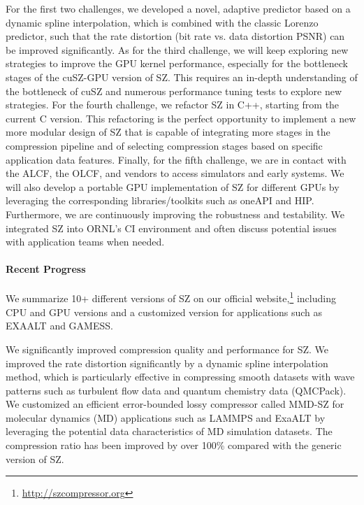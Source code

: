 For the first two challenges, we developed a novel, adaptive predictor based on a dynamic spline interpolation, which is combined with the classic Lorenzo predictor, such that the rate distortion (bit rate vs. data distortion PSNR) can be improved significantly.
%
As for the third challenge, we will keep exploring new strategies to improve the GPU kernel performance, especially for the bottleneck stages of the cuSZ-GPU version of SZ. This requires an in-depth understanding of the bottleneck of cuSZ and numerous performance tuning tests to explore new strategies.   
%
For the fourth challenge, we refactor SZ in C++, starting from the current C version. This refactoring is the perfect opportunity to implement a new more modular design of SZ that is capable of integrating more stages in the compression pipeline and of selecting compression stages based on specific application data features.
%
Finally, for the fifth challenge, we are in contact with the ALCF, the OLCF, and vendors to access simulators and early systems. We will also develop a portable GPU implementation of SZ for different GPUs by leveraging the corresponding libraries/toolkits such as oneAPI and HIP.
%
Furthermore, we are continuously improving the robustness and testability. We integrated SZ into ORNL's CI environment and often discuss potential issues with application teams when needed. 

\paragraph{Recent Progress}

We summarize 10+ different versions of SZ on our official website,\footnote{\url{http://szcompressor.org}} including CPU and GPU versions and a customized version for applications such as EXAALT and GAMESS. 

We significantly improved compression quality and performance for SZ. We improved the rate distortion significantly by a dynamic spline interpolation method, which is particularly effective in compressing smooth datasets with wave patterns such as turbulent flow data and quantum chemistry data (QMCPack). We customized an efficient error-bounded lossy compressor called MMD-SZ for molecular dynamics (MD) applications such as LAMMPS and ExaALT by leveraging the potential data characteristics of MD simulation datasets. The compression ratio has been improved by over 100\% compared with the generic version of SZ. 

